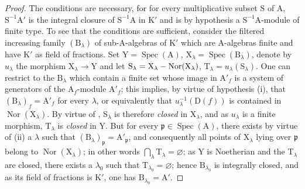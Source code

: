 \begin{proof}
The conditions are necessary, for for every multiplicative subset $\mathrm{S}$ of $\mathrm{A}$,
$\mathrm{S}^{-1}\mathrm{A}'$ is the integral closure of $\mathrm{S}^{-1}\mathrm{A}$ in $\mathrm{K}'$ and is by hypothesis a $\mathrm{S}^{-1}\mathrm{A}$-module
of finite type. To see that the conditions are sufficient, consider the filtered increasing
family $(\mathrm{B}_\lambda)$ of sub-$\mathrm{A}$-algebras of $\mathrm{K}'$ which are $\mathrm{A}$-algebras finite and have $\mathrm{K}'$ as
field of fractions. Set $\mathrm{Y}=\operatorname{Spec}(\mathrm{A})$, $\mathrm{X}_\lambda=\operatorname{Spec}(\mathrm{B}_\lambda)$, denote by $u_\lambda$ the
morphism $\mathrm{X}_\lambda\to\mathrm{Y}$ and let $\mathrm{S}_\lambda=\mathrm{X}_\lambda-\operatorname{Nor}(\mathrm{X}_\lambda)$, $\mathrm{T}_\lambda=u_\lambda(\mathrm{S}_\lambda)$. One can restrict to the $\mathrm{B}_\lambda$
which contain a finite set whose image in $\mathrm{A}'_f$ is a system of generators of the
$\mathrm{A}_f$-module $\mathrm{A}'_f$; this implies, by virtue of hypothesis (i), that $(\mathrm{B}_\lambda)_f=\mathrm{A}'_f$ for every $\lambda$,
or equivalently that $u_\lambda^{-1}(\mathrm{D}(f))$ is contained in $\operatorname{Nor}(\mathrm{X}_\lambda)$. By virtue of , $\mathrm{S}_\lambda$ is therefore
\emph{closed} in $\mathrm{X}_\lambda$, and as $u_\lambda$ is a finite morphism, $\mathrm{T}_\lambda$ is \emph{closed} in $\mathrm{Y}$. But for every
$\mathfrak{p}\in\operatorname{Spec}(\mathrm{A})$, there exists by virtue of (ii) a $\lambda$ such that $(\mathrm{B}_\lambda)_\mathfrak{p}=\mathrm{A}'_\mathfrak{p}$, and consequently all points
of $\mathrm{X}_\lambda$ lying over $\mathfrak{p}$ belong to $\operatorname{Nor}(\mathrm{X}_\lambda)$; in other words $\bigcap_\lambda\mathrm{T}_\lambda=\varnothing$; as
$\mathrm{Y}$ is Noetherian and the $\mathrm{T}_\lambda$ are closed, there exists a $\lambda_0$ such that $\mathrm{T}_{\lambda_0}=\varnothing$; hence $\mathrm{B}_{\lambda_0}$
is integrally closed, and as its field of fractions is $\mathrm{K}'$, one has $\mathrm{B}_{\lambda_0}=\mathrm{A}'$.
\end{proof}

